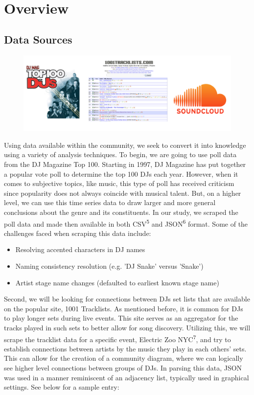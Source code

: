 \documentclass[12pt]{dalcsthesis}
\begin{document}
\chapter{Overview}

\section{Data Sources}

\begin{figure}[h]
\includegraphics[scale=.50]{sources}
\centering
\end{figure}

Using data available within the community, we seek to convert it into knowledge using a variety of analysis techniques. To begin, we are going to use poll data from the DJ Magazine Top 100. Starting in 1997, DJ Magazine has put together a popular vote poll to determine the top 100 DJs each year. However, when it comes to subjective topics, like music, this type of poll has received criticism since popularity does not always coincide with musical talent. But, on a higher level, we can use this time series data to draw larger and more general conclusions about the genre and its constituents. In our study, we scraped the poll data and made then available in both CSV\textsuperscript{5} and JSON\textsuperscript{6} format. Some of the challenges faced when scraping this data include: 

\begin{itemize}
  \item Resolving accented characters in DJ names
  \item Naming consistency resolution (e.g. 'DJ Snake' versus 'Snake')
  \item Artist stage name changes (defaulted to earliest known stage name)
\end{itemize}

Second, we will be looking for connections between DJs set lists that are available on the popular site, 1001 Tracklists. As mentioned before, it is common for DJs to play longer sets during live events. This site serves as an aggregator for the tracks played in such sets to better allow for song discovery. Utilizing this, we will scrape the tracklist data for a specific event, Electric Zoo NYC\textsuperscript{7}, and try to establish connections between artists by the music they play in each others' sets. This can allow for the creation of a community diagram, where we can logically see higher level connections between groups of DJs. In parsing this data, JSON was used in a manner reminiscent of an adjacency list, typically used in graphical settings. See below for a sample entry:\\
\end{document}

